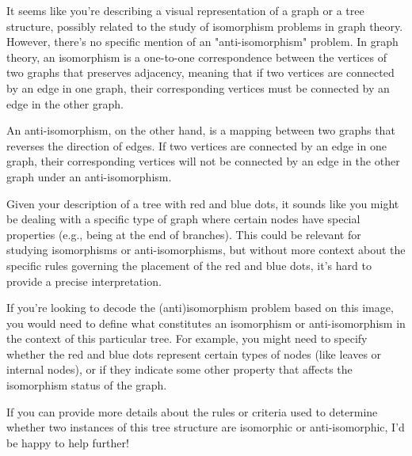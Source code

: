 It seems like you're describing a visual representation of a graph or a tree structure, possibly related to the study of isomorphism problems in graph theory. However, there's no specific mention of an "anti-isomorphism" problem. In graph theory, an isomorphism is a one-to-one correspondence between the vertices of two graphs that preserves adjacency, meaning that if two vertices are connected by an edge in one graph, their corresponding vertices must be connected by an edge in the other graph.

An anti-isomorphism, on the other hand, is a mapping between two graphs that reverses the direction of edges. If two vertices are connected by an edge in one graph, their corresponding vertices will not be connected by an edge in the other graph under an anti-isomorphism.

Given your description of a tree with red and blue dots, it sounds like you might be dealing with a specific type of graph where certain nodes have special properties (e.g., being at the end of branches). This could be relevant for studying isomorphisms or anti-isomorphisms, but without more context about the specific rules governing the placement of the red and blue dots, it's hard to provide a precise interpretation.

If you're looking to decode the (anti)isomorphism problem based on this image, you would need to define what constitutes an isomorphism or anti-isomorphism in the context of this particular tree. For example, you might need to specify whether the red and blue dots represent certain types of nodes (like leaves or internal nodes), or if they indicate some other property that affects the isomorphism status of the graph.

If you can provide more details about the rules or criteria used to determine whether two instances of this tree structure are isomorphic or anti-isomorphic, I'd be happy to help further!
